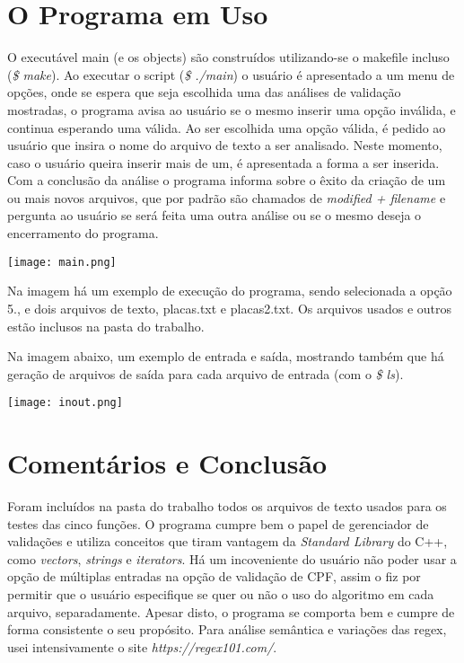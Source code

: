 \documentclass[paper=a4, fontsize=12pt]{scrartcl} %
\numberwithin{equation}{section} %
\numberwithin{figure}{section} %
\numberwithin{table}{section} %
\begin{document}
\section{O Programa em Uso}

O executável main (e os objects) são construídos utilizando-se o makefile incluso (\textit{\$ make}). 
Ao executar o script (\textit{\$ ./main}) o usuário é apresentado a um menu de opções, onde se espera que seja escolhida uma das análises de validação mostradas, o programa avisa ao usuário se o mesmo inserir uma opção inválida, e continua esperando uma válida. Ao ser escolhida uma opção válida, é pedido ao usuário que insira o nome do arquivo de texto a ser analisado. Neste momento, caso o usuário queira inserir mais de um, é apresentada a forma a ser inserida. Com a conclusão da análise o programa informa sobre o êxito da criação de um ou mais novos arquivos, que por padrão são chamados de \textit{modified + filename} e pergunta ao usuário se será feita uma outra análise ou se o mesmo deseja o encerramento do programa.

\texttt{[image: main.png]}

Na imagem há um exemplo de execução do programa, sendo selecionada a opção 5., e dois arquivos de texto, placas.txt e placas2.txt. Os arquivos usados e outros estão inclusos na pasta do trabalho.

Na imagem abaixo, um exemplo de entrada e saída, mostrando também que há geração de arquivos de saída para cada arquivo de entrada (com o \textit{\$ ls}).

\texttt{[image: inout.png]}

\section{Comentários e Conclusão}

Foram incluídos na pasta do trabalho todos os arquivos de texto usados para os testes das cinco funções. O programa cumpre bem o papel de gerenciador de validações e utiliza conceitos que tiram vantagem da \textit{Standard Library} do C++, como \textit{vectors}, \textit{strings} e \textit{iterators}. Há um incoveniente do usuário não poder usar a opção de múltiplas entradas na opção de validação de CPF, assim o fiz por permitir que o usuário especifique se quer ou não o uso do algoritmo em cada arquivo, separadamente. Apesar disto, o programa se comporta bem e cumpre de forma consistente o seu propósito. Para análise semântica e variações das regex, usei intensivamente o site \textit{https://regex101.com/}.
\end{document}

